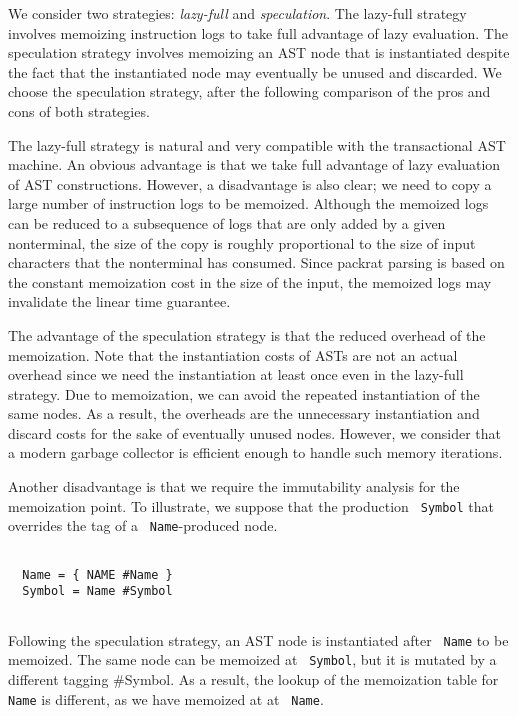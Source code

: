 \documentclass[JIP]{ipsj}
\newcommand{\nt}[1]{{\tt {\color{darkblue} #1}}}
\begin{document}
We consider two strategies: {\em lazy-full} and {\em speculation}. The lazy-full strategy involves memoizing instruction logs to take full advantage of lazy evaluation. The speculation strategy involves memoizing an AST node that is instantiated despite the fact that the instantiated node may eventually be unused and discarded. We choose the speculation strategy, after the following comparison of the pros and cons of both strategies. 

The lazy-full strategy is natural and very compatible with the transactional AST machine. An obvious advantage is that we take full advantage of lazy evaluation of AST constructions. However, a disadvantage is also clear;  we need to copy a large number of instruction logs to be memoized. Although the memoized logs can be reduced to a subsequence of logs that are only added by a given nonterminal, the size of the copy is roughly proportional to the size of input characters that the nonterminal has consumed. Since packrat parsing is based on the constant memoization cost in the size of the input, the memoized logs may invalidate the linear time guarantee. 

The advantage of the speculation strategy is that the reduced overhead of the memoization. Note that the instantiation costs of ASTs are not an actual overhead since we need the instantiation at least once even in the lazy-full strategy. Due to memoization, we can avoid the repeated instantiation of the same nodes. As a result, the overheads are the unnecessary instantiation and discard costs for the sake of eventually unused nodes. However, we consider that a modern garbage collector is efficient enough to handle such memory iterations. 


Another disadvantage is that we require the immutability analysis for the memoization point. To illustrate, we suppose that the production \nt{Symbol} that overrides the tag of a \nt{Name}-produced node.

{\small \begin{verbatim}

  Name = { NAME #Name }
  Symbol = Name #Symbol
  
\end{verbatim}}

Following the speculation strategy, an AST node is instantiated after \nt{Name} to be memoized. The same node can be memoized at \nt{Symbol}, but it is mutated by a different tagging \#Symbol. As a result, the lookup of the memoization table for \nt{Name} is different, as we have memoized at at \nt{Name}. 
\end{document}
